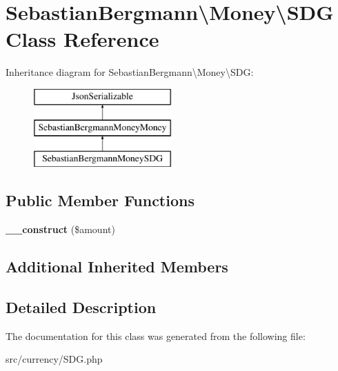 \hypertarget{classSebastianBergmann_1_1Money_1_1SDG}{}\section{Sebastian\+Bergmann\textbackslash{}Money\textbackslash{}S\+D\+G Class Reference}
\label{classSebastianBergmann_1_1Money_1_1SDG}
Inheritance diagram for Sebastian\+Bergmann\textbackslash{}Money\textbackslash{}S\+D\+G\+:\begin{figure}[H]
\begin{center}
\leavevmode
\includegraphics[height=3.000000cm]{classSebastianBergmann_1_1Money_1_1SDG}
\end{center}
\end{figure}
\subsection*{Public Member Functions}
\begin{DoxyCompactItemize}
\item 
\hypertarget{classSebastianBergmann_1_1Money_1_1SDG_a006ee757e3da3094d9f038b35bfc98c4}{}{\bfseries \+\_\+\+\_\+construct} (\$amount)\label{classSebastianBergmann_1_1Money_1_1SDG_a006ee757e3da3094d9f038b35bfc98c4}

\end{DoxyCompactItemize}
\subsection*{Additional Inherited Members}


\subsection{Detailed Description}


The documentation for this class was generated from the following file\+:\begin{DoxyCompactItemize}
\item 
src/currency/S\+D\+G.\+php\end{DoxyCompactItemize}
